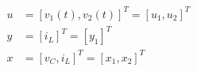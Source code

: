   \begin{align*}
    \tag{Entradas del sistema}
    u &= \left[ v_1(t), v_2(t) \right]^T  = [u_1, u_2]^T\\
    \tag{Saildas del sistema}
    y &= \left[ i_L \right]^T = [y_1]^T \\
    \tag{Estados del sistema}
    x &= \left[ v_C, i_L \right]^T = [x_1, x_2]^T
  \end{align*}

